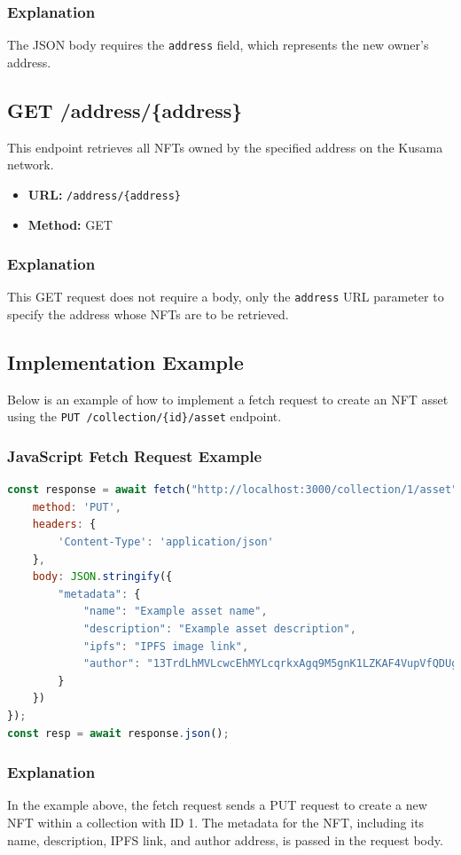 \subsubsection{Explanation}
The JSON body requires the \texttt{address} field, which represents the new owner's address.

\subsection{GET /address/\{address\}}
This endpoint retrieves all NFTs owned by the specified address on the Kusama network.

\begin{itemize}
    \item \textbf{URL:} \texttt{/address/\{address\}}
    \item \textbf{Method:} GET
\end{itemize}

\subsubsection{Explanation}
This GET request does not require a body, only the \texttt{address} URL parameter to specify the address whose NFTs are to be retrieved.

\subsection{Implementation Example}
Below is an example of how to implement a fetch request to create an NFT asset using the \texttt{PUT /collection/\{id\}/asset} endpoint.

\subsubsection{JavaScript Fetch Request Example}
\begin{lstlisting}[language=Javascript]
const response = await fetch("http://localhost:3000/collection/1/asset", {
    method: 'PUT',
    headers: {
        'Content-Type': 'application/json'
    },
    body: JSON.stringify({
        "metadata": {
            "name": "Example asset name",
            "description": "Example asset description",
            "ipfs": "IPFS image link",
            "author": "13TrdLhMVLcwcEhMYLcqrkxAgq9M5gnK1LZKAF4VupVfQDUg"
        }
    })
});
const resp = await response.json();
\end{lstlisting}

\subsubsection{Explanation}
In the example above, the fetch request sends a PUT request to create a new NFT within a collection with ID 1. The metadata for the NFT, including its name, description, IPFS link, and author address, is passed in the request body.

